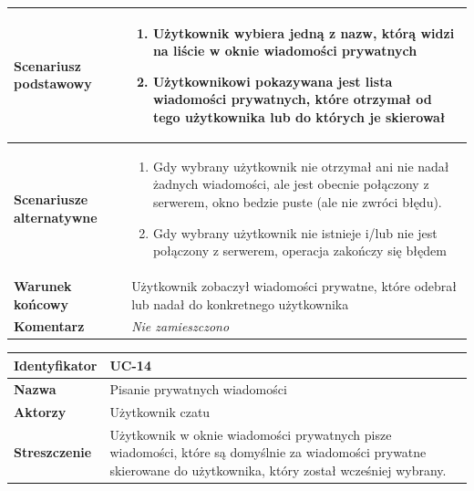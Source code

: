 \documentclass[11pt,oneside,a4paper,titlepage,onecolumn]{article}
\newenvironment{enumreq}
{ \begin{enumerate}[topsep=0pt,itemsep=-1ex,partopsep=1ex,parsep=1ex] }
{ \end{enumerate}                  }
\begin{document}
{\begin{tabular}{ | l | l | }
	\hline
		\parbox[t]{4cm}{\textbf{Scenariusz podstawowy}} & \parbox[t]{11cm}{
			\begin{enumreq}
				\item Użytkownik wybiera jedną z nazw, którą widzi na
				liście w oknie wiadomości prywatnych
				\item Użytkownikowi pokazywana jest lista wiadomości
				prywatnych, które otrzymał od tego użytkownika lub
				do których je skierował
			\end{enumreq}
		}
		\\
		
	\hline
		\parbox[t]{4cm}{\textbf{Scenariusze alternatywne}} & \parbox[t]
		{11cm}{
			\begin{enumreq}
				\item Gdy wybrany użytkownik nie otrzymał ani nie nadał żadnych
				wiadomości, ale jest obecnie połączony z serwerem, okno
				bedzie puste (ale nie zwróci błędu).
				\item Gdy wybrany użytkownik nie istnieje i/lub nie jest
				połączony z serwerem, operacja zakończy się błędem
			\end{enumreq}
		}
		\\
		
	\hline
		\parbox[t]{4cm}{\textbf{Warunek końcowy}} & \parbox[t]{11cm}{
			Użytkownik zobaczył wiadomości prywatne, które odebrał lub nadał
			do konkretnego użytkownika
		}
		\\
		
	\hline
		\parbox[t]{4cm}{\textbf{Komentarz}} & \parbox[t]{11cm}{
			\textit{Nie zamieszczono}
		}
		\\

	\hline
\end{tabular}

\vspace{2em}

\begin{tabular}{ | l | l | }
	\hline
		\textbf{Identyfikator} & 
		UC-14
		\\
		
	\hline
		\textbf{Nazwa} & 
		Pisanie prywatnych wiadomości
		\\
		
	\hline
		\textbf{Aktorzy} & \parbox[t]{11cm}{
			Użytkownik czatu
		}\\
		 
	\hline
		\parbox[t]{4cm}{\textbf{Streszczenie}} & \parbox[t]{11cm}{
			Użytkownik w oknie wiadomości prywatnych pisze wiadomości,
			które są domyślnie za wiadomości prywatne skierowane do
			użytkownika, który został wcześniej wybrany.
			
}
\end{tabular}}
\end{document}
